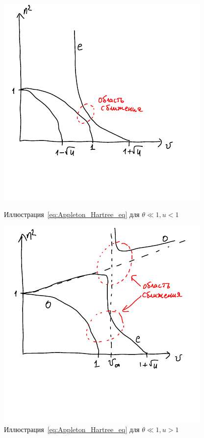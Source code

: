 \documentclass[10pt, a4paper]{article}
\begin{document}
\begin{itemize}
	\begin{figure}[ht]
		\begin{center}
			\begin{minipage}[h]{0.35\linewidth}
				\includegraphics[width=1\linewidth]{theta-small-u-less-1.pdf}
				\caption{Иллюстрация~\eqref{eq:Appleton_Hartree_eq} для $\theta \ll 1, u<1$} 
				\label{fig:disp_eq_th_small_u_less_1}
			\end{minipage}
			\hfill
			\begin{minipage}[h]{0.35\linewidth}
				\includegraphics[width=1\linewidth]{theta-small-u-more-1.pdf}
				\caption{Иллюстрация~\eqref{eq:Appleton_Hartree_eq} для $\theta \ll 1, u>1$}
				\label{fig:disp_eq_th_small_u_more_1}
			\end{minipage}
		\end{center}
	\end{figure}


\end{itemize}
\end{document}
